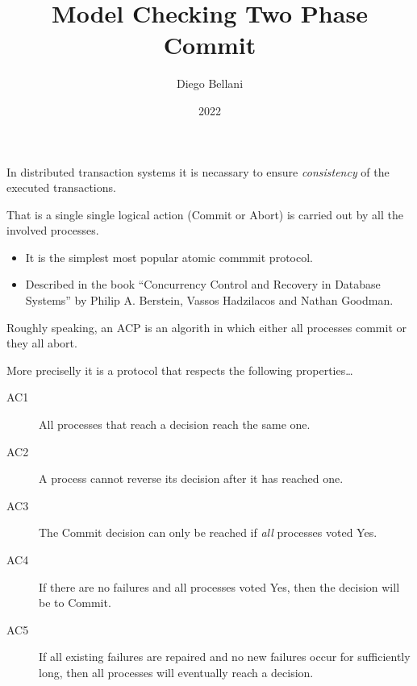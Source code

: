\documentclass[landscape]{slides}
\title{Model Checking Two Phase Commit}
\author{Diego Bellani}
\date{2022}
\newcommand{\slidetitle}{}
\newcommand{\settitle}[1]{\renewcommand{\slidetitle}{#1}}
\begin{document}
\maketitle

\begin{slide}
\settitle{The Problem}
In distributed transaction systems it is necassary to ensure \emph{consistency}
of the executed transactions.

That is a single single logical action (Commit or Abort) is carried out by all
the involved processes.
\end{slide}

\begin{slide}
\settitle{The Two Phase Commit Protocol}
\begin{itemize}
\item It is the simplest most popular atomic commmit protocol.
\item Described in the book ``Concurrency Control and Recovery in Database
	Systems'' by Philip A. Berstein, Vassos Hadzilacos and Nathan Goodman.
\end{itemize}
\end{slide}

\begin{slide}
\settitle{What's an Atomic Commit Protocol?}
Roughly speaking, an ACP is an algorith in which either all processes commit or
they all abort.

More preciselly it is a protocol that respects the following properties\dots

\begin{overlay}
\begin{description}
\item[AC1] All processes that reach a decision reach the same one.
\item[AC2] A process cannot reverse its decision after it has reached one.
\item[AC3] The Commit decision can only be reached if \emph{all} processes voted
	Yes.
\item[AC4] If there are no failures and all processes voted Yes, then the
	decision will be to Commit.
\item[AC5] If all existing failures are repaired and no new failures occur for
	sufficiently long, then all processes will eventually reach a decision.
\end{description}
\end{overlay}
\end{slide}
\end{document}
